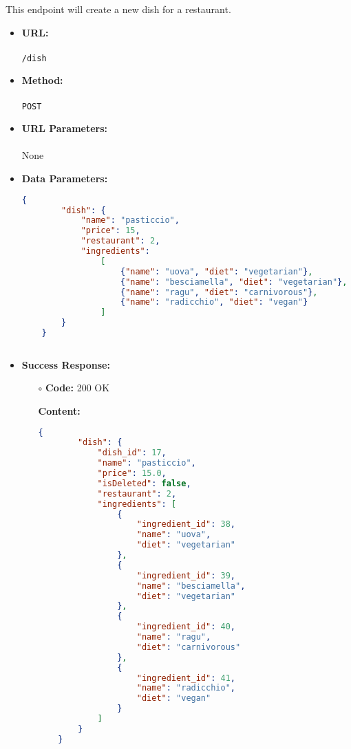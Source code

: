 

This endpoint will create a new dish for a restaurant.

\begin{itemize}
    \item \textbf{URL:} \\\\\texttt{/dish}
    \item \textbf{Method:} \\\\\texttt{POST}
    \item \textbf{URL Parameters:} \\\\None
    \item \textbf{Data Parameters:}
	\begin{lstlisting}[language=json]
    {
        "dish": {
            "name": "pasticcio",
            "price": 15,
            "restaurant": 2,
            "ingredients": 
                [ 
                    {"name": "uova", "diet": "vegetarian"},
                    {"name": "besciamella", "diet": "vegetarian"},
                    {"name": "ragu", "diet": "carnivorous"},
                    {"name": "radicchio", "diet": "vegan"}
                ]
        }
    }	
	
	\end{lstlisting}
    \item \textbf{Success Response:}
		\begin{itemize}
			\item[$\circ$] \textbf{Code:} 200 OK
			\item[] \textbf{Content:}
			\begin{lstlisting}[language=json]
    {
        "dish": {
            "dish_id": 17,
            "name": "pasticcio",
            "price": 15.0,
            "isDeleted": false,
            "restaurant": 2,
            "ingredients": [
                {
                    "ingredient_id": 38,
                    "name": "uova",
                    "diet": "vegetarian"
                },
                {
                    "ingredient_id": 39,
                    "name": "besciamella",
                    "diet": "vegetarian"
                },
                {
                    "ingredient_id": 40,
                    "name": "ragu",
                    "diet": "carnivorous"
                },
                {
                    "ingredient_id": 41,
                    "name": "radicchio",
                    "diet": "vegan"
                }
            ]
        }
    }
			\end{lstlisting}
		\end{itemize}
	

\end{itemize}
